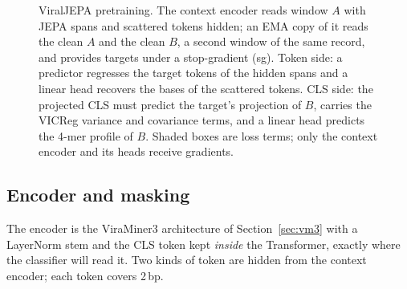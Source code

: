\documentclass[10pt,twocolumn,a4paper]{article}
\begin{document}
\begin{figure}[t]
{}
\caption{ViralJEPA pretraining. The context encoder reads window $A$ with JEPA
spans and scattered tokens hidden; an EMA copy of it reads the clean $A$ and the
clean $B$, a second window of the same record, and provides targets under a
stop-gradient (sg). Token side: a predictor regresses the target tokens of the
hidden spans and a linear head recovers the bases of the scattered tokens. CLS
side: the projected CLS must predict the target's projection of $B$, carries the
VICReg variance and covariance terms, and a linear head predicts the 4-mer
profile of $B$. Shaded boxes are loss terms; only the context encoder and its
heads receive gradients.}
\label{fig:arch}
\end{figure}

\subsection{Encoder and masking}

The encoder is the ViraMiner3 architecture of Section~\ref{sec:vm3} with a
LayerNorm stem and the CLS token kept \emph{inside} the Transformer, exactly
where the classifier will read it. Two kinds of token are hidden from the context
encoder; each token covers 2\,bp.
\end{document}
